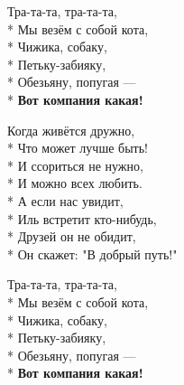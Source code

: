 \begin{minipage}{\linewidth}
\hspace*{1.5em}Тра-та-та, тра-та-та,\\*
\hspace*{1.5em}Мы везём с собой кота,\\*
\hspace*{1.5em}Чижика, собаку,\\*
\hspace*{1.5em}Петьку-забияку,\\*
\hspace*{1.5em}Обезьяну, попугая —\\*
\hspace*{1.5em}\textbf{Вот компания какая!}\\
\end{minipage}\par\medskip\nobreak

\medskip

\begin{minipage}{\linewidth}
Когда живётся дружно,\\*
Что может лучше быть!\\*
И ссориться не нужно,\\*
И можно всех любить.\\*
А если нас увидит,\\*
Иль встретит кто-нибудь,\\*
Друзей он не обидит,\\*
Он скажет: "В добрый путь!"\\
\end{minipage}\par\medskip\nobreak

\medskip

\begin{minipage}{\linewidth}
\hspace*{1.5em}Тра-та-та, тра-та-та,\\*
\hspace*{1.5em}Мы везём с собой кота,\\*
\hspace*{1.5em}Чижика, собаку,\\*
\hspace*{1.5em}Петьку-забияку,\\*
\hspace*{1.5em}Обезьяну, попугая —\\*
\hspace*{1.5em}\textbf{Вот компания какая!}\\
\end{minipage}\par\medskip\nobreak


